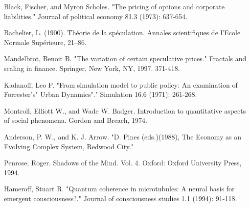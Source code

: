 \documentclass[a4paper,titlepage,12pt,fleqn,oneside]{report}
\begin{document}
\begin{thebibliography}{99}

\begin{LTRitems}
	Black, Fischer, and Myron Scholes. "The pricing of options and corporate liabilities." Journal of political economy 81.3 (1973): 637-654.
\end{LTRitems}	
	
\begin{LTRitems}
Bachelier, L. (1900). Théorie de la spéculation. Annales scientifiques de l’Ecole
Normale Supérieure, 21–86.
\end{LTRitems}

\begin{LTRitems}
	Mandelbrot, Benoit B. "The variation of certain speculative prices." Fractals and scaling in finance. Springer, New York, NY, 1997. 371-418.
\end{LTRitems}

\begin{LTRitems}
	Kadanoff, Leo P. "From simulation model to public policy: An examination of Forrester's" Urban Dynamics"." Simulation 16.6 (1971): 261-268.
\end{LTRitems}

\begin{LTRitems}
	Montroll, Elliott W., and Wade W. Badger. Introduction to quantitative aspects of social phenomena. Gordon and Breach, 1974.
\end{LTRitems}

\begin{LTRitems}
	Anderson, P. W., and K. J. Arrow. "D. Pines (eds.)(1988), The Economy as an Evolving Complex System, Redwood City."
\end{LTRitems}

\begin{LTRitems}
	Penrose, Roger. Shadows of the Mind. Vol. 4. Oxford: Oxford University Press, 1994.
\end{LTRitems}

\begin{LTRitems}
	Hameroff, Stuart R. "Quantum coherence in microtubules: A neural basis for emergent consciousness?." Journal of consciousness studies 1.1 (1994): 91-118.
\end{LTRitems}


\end{thebibliography}
\end{document}
